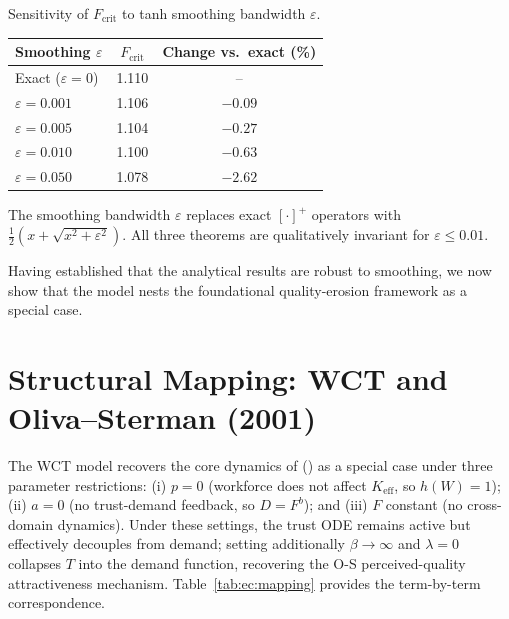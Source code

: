 \documentclass[msom,dblanonrev]{informs4}
\newcommand{\Keff}{K_{\mathrm{eff}}}
\begin{document}
\begin{table}
\TABLE
{Sensitivity of $F_{\mathrm{crit}}$ to tanh smoothing bandwidth $\varepsilon$.\label{tab:ec:smooth}}
{\begin{tabular}{@{}lcc@{}}
\toprule
Smoothing $\varepsilon$ & $F_{\mathrm{crit}}$ & Change vs.\ exact (\%) \\
\midrule
Exact ($\varepsilon = 0$) & 1.110 & -- \\
$\varepsilon = 0.001$ & 1.106 & $-0.09$ \\
$\varepsilon = 0.005$ & 1.104 & $-0.27$ \\
$\varepsilon = 0.010$ & 1.100 & $-0.63$ \\
$\varepsilon = 0.050$ & 1.078 & $-2.62$ \\
\bottomrule
\end{tabular}}
{The smoothing bandwidth $\varepsilon$ replaces exact $[\cdot]^+$ operators with $\tfrac{1}{2}(x + \sqrt{x^2 + \varepsilon^2})$. All three theorems are qualitatively invariant for $\varepsilon \leq 0.01$.}
\end{table}

Having established that the analytical results are robust to smoothing, we now show that the model nests the foundational quality-erosion framework as a special case.

\section{Structural Mapping: WCT and Oliva--Sterman (2001)}\label{sec:ec:nesting}

The WCT model recovers the core dynamics of \citeauthor{oliva2001cutting} (\citeyear{oliva2001cutting}) as a special case under three parameter restrictions: (i) $p = 0$ (workforce does not affect $\Keff$, so $h(W)=1$); (ii) $a = 0$ (no trust-demand feedback, so $D = F^b$); and (iii) $F$ constant (no cross-domain dynamics). Under these settings, the trust ODE remains active but effectively decouples from demand; setting additionally $\beta \to \infty$ and $\lambda = 0$ collapses $T$ into the demand function, recovering the O-S perceived-quality attractiveness mechanism. Table~\ref{tab:ec:mapping} provides the term-by-term correspondence.
\end{document}
